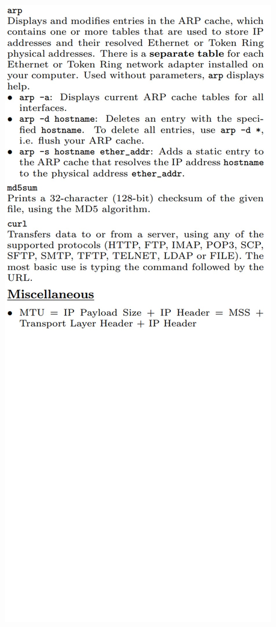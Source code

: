 \documentclass[12pt, landscape]{article}
\begin{document}
\begin{multicols*}{3}
\centerline{\includegraphics[width=0.90\linewidth]{command3}}


















  
  
  
\end{multicols*}
\end{document}
